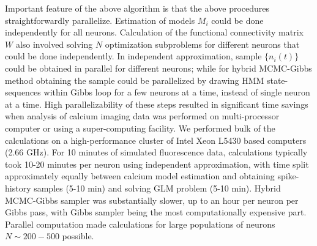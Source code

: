 Important feature of the above algorithm is that the above procedures straightforwardly parallelize. Estimation of models $M_i$ could be done independently for all neurons. Calculation of the functional connectivity matrix $W$ also involved solving $N$ optimization subproblems for different neurons that could be done independently. In independent approximation, sample $\{ n_i(t)\}$ could be obtained in parallel for different neurons; while for hybrid MCMC-Gibbs method obtaining the sample could be parallelized by drawing HMM state-sequences within Gibbs loop for a few neurons at a time, instead of single neuron at a time. High parallelizability of these steps resulted in significant time savings when analysis of calcium imaging data was performed on multi-processor computer or using a super-computing facility.  We performed bulk of the calculations on a high-performance cluster of Intel Xeon L5430 based computers (2.66 GHz). For 10 minutes of simulated fluorescence data, calculations typically took 10-20 minutes per neuron using independent approximation, with time split approximately equally between calcium model estimation and obtaining spike-history samples (5-10 min) and solving GLM problem (5-10 min). Hybrid MCMC-Gibbs sampler was substantially slower, up to an hour per neuron per Gibbs pass, with Gibbs sampler being the most computationally expensive part. Parallel computation made calculations for large populations of neurons $N\sim 200-500$ possible.
